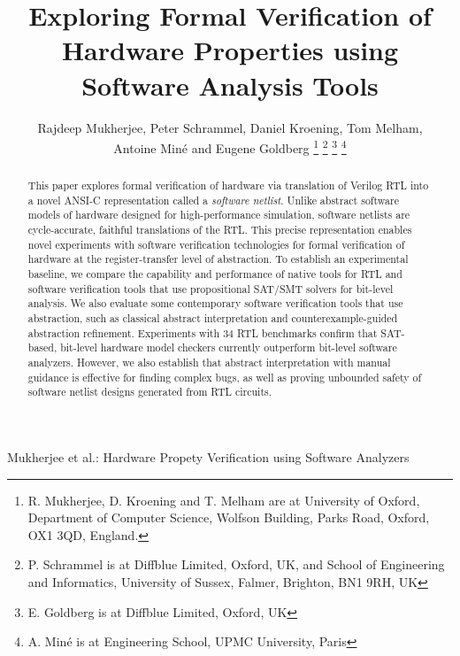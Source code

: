 \documentclass[journal]{IEEEtran}
\theoremstyle{definition}
\begin{document}
\title{Exploring Formal Verification of Hardware Properties using Software Analysis Tools}

\author{Rajdeep Mukherjee, 
        Peter Schrammel,
        Daniel Kroening, 
        Tom Melham, \\
        Antoine Min{\'e} and
        Eugene Goldberg
        \thanks{R. Mukherjee, D. Kroening and T. Melham are at 
                University of Oxford, Department of Computer Science,
                Wolfson Building, Parks Road,
                Oxford, OX1 3QD, England.}
        \thanks{P. Schrammel is at  Diffblue Limited, Oxford, UK, and
                School of Engineering and Informatics,
                University of Sussex, Falmer, Brighton, BN1 9RH, UK}
        \thanks{E. Goldberg is at Diffblue Limited, Oxford, UK}
        \thanks{A. Min{\'e} is at Engineering School, UPMC University, Paris}}
%
         {Mukherjee et al.: Hardware Propety Verification using Software Analyzers}

\maketitle

\begin{abstract}
%
This paper explores formal verification of hardware via translation of
Verilog RTL into a novel ANSI-C representation called a \emph{software
netlist}.  Unlike abstract software models of hardware designed for
high-performance simulation, software netlists are cycle-accurate, faithful
translations of the RTL.  This precise representation enables novel
experiments with software verification technologies for formal verification
of hardware at the register-transfer level of abstraction.  To establish an
experimental baseline, we compare the capability and performance of native
tools for RTL and software verification tools that use propositional SAT/SMT
solvers for bit-level analysis.  We also evaluate some contemporary software
verification tools that use abstraction, such as classical abstract
interpretation and counterexample-guided abstraction refinement. 
Experiments with 34 RTL benchmarks confirm that SAT-based, bit-level
hardware model checkers currently outperform bit-level software analyzers. 
However, we also establish that abstract interpretation with manual guidance
is effective for finding complex bugs, as well as proving unbounded safety
of software netlist designs generated from RTL circuits.
%
\end{abstract}
\end{document}
